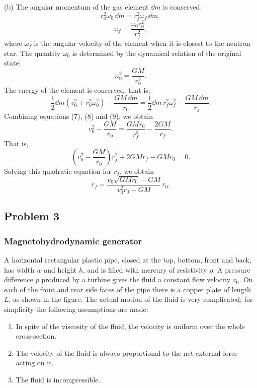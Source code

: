 (b) The angular momentum of the gas element $\dd m$ is conserved:
\begin{equation}
r_0^2\omega_0\,\dd m=r_f^2\omega_f\,\dd m, \tag{7}
\end{equation}
\[
\omega_f=\frac{\omega_0 r_0^2}{r_f^2},
\]
where $\omega_f$ is the angular velocity of the element when it is closest to the neutron star. The quantity $\omega_0$ is determined by the dynamical relation of the original state:
\begin{equation}
\omega_0^2=\frac{GM}{r_0^3}. \tag{8}
\end{equation}
The energy of the element is conserved, that is,
\begin{equation}
\frac{1}{2}\dd m\left(v_0^2+r_0^2\omega_0^2\right)-\frac{GM\,\dd m}{r_0}
=\frac{1}{2}\dd m\,r_f^2\omega_f^2-\frac{GM\,\dd m}{r_f}. \tag{9}
\end{equation}
Combining equations (7), (8) and (9), we obtain
\[
v_0^2-\frac{GM}{r_0}=\frac{GMr_0}{r_f^2}-\frac{2GM}{r_f}.
\]
That is,
\[
\left(v_0^2-\frac{GM}{r_0}\right)r_f^2+2GMr_f-GMr_0=0.
\]
Solving this quadratic equation for $r_f$, we obtain
\begin{equation}
r_f=\frac{v_0\sqrt{GMr_0}-GM}{v_0^2r_0-GM}\,r_0. \tag{10}
\end{equation}

\subsection*{Problem 3}

\subsubsection*{Magnetohydrodynamic generator}

A horizontal rectangular plastic pipe, closed at the top, bottom, front and back, has width $w$ and height $h$, and is filled with mercury of resistivity $\rho$. A pressure difference $p$ produced by a turbine gives the fluid a constant flow velocity $v_0$. On each of the front and rear side faces of the pipe there is a copper plate of length $L$, as shown in the figure. The actual motion of the fluid is very complicated; for simplicity the following assumptions are made:

\begin{enumerate}
\item[(1)] In spite of the viscosity of the fluid, the velocity is uniform over the whole cross-section.
\item[(2)] The velocity of the fluid is always proportional to the net external force acting on it.
\item[(3)] The fluid is incompressible.
\end{enumerate}

